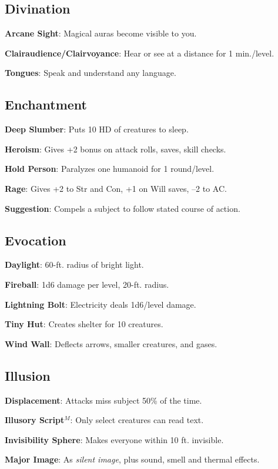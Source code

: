 \subsection{Divination}


\textbf{Arcane Sight}: Magical auras become visible to you.

\textbf{Clairaudience/Clairvoyance}: Hear or see at a distance for 1 min./level.

\textbf{Tongues}: Speak and understand any language.

\subsection{Enchantment}


\textbf{Deep Slumber}: Puts 10 HD of creatures to sleep.

\textbf{Heroism}: Gives +2 bonus on attack rolls, saves, skill checks.

\textbf{Hold Person}: Paralyzes one humanoid for 1 round/level.

\textbf{Rage}: Gives +2 to Str and Con, +1 on Will saves, --2 to AC.

\textbf{Suggestion}: Compels a subject to follow stated course of action.

\subsection{Evocation}


\textbf{Daylight}: 60-ft. radius of bright light.

\textbf{Fireball}: 1d6 damage per level, 20-ft. radius.

\textbf{Lightning Bolt}: Electricity deals 1d6/level damage.

\textbf{Tiny Hut}: Creates shelter for 10 creatures.

\textbf{Wind Wall}: Deflects arrows, smaller creatures, and gases.

\subsection{Illusion}


\textbf{Displacement}: Attacks miss subject 50\% of the time.

\textbf{Illusory Script}\(^{M}\): Only select creatures can read text.

\textbf{Invisibility Sphere}: Makes everyone within 10 ft. invisible.

\textbf{Major Image}: As \textit{silent image}, plus sound, smell and thermal effects.

